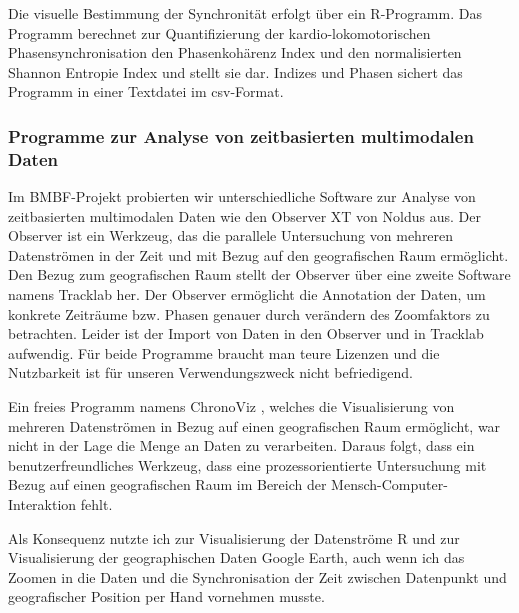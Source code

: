 Die visuelle Bestimmung der Synchronität erfolgt über ein R-Programm. Das Programm berechnet zur Quantifizierung der kardio-lokomotorischen Phasensynchronisation den Phasenkohärenz Index \citep{Rosenblum2003} und den normalisierten Shannon Entropie Index \citep{Tass1998, Niizeki2005} und stellt sie dar. Indizes und Phasen sichert das Programm in einer Textdatei im \acs{csv}-Format.

\subsubsection{Programme zur Analyse von zeitbasierten multimodalen Daten} 

\label{ssub:programme_zur_analyse_von_zeitbasierten_multimodalen_daten}

Im \acs{BMBF}-Projekt probierten wir unterschiedliche Software zur Analyse von zeitbasierten multimodalen Daten wie den Observer XT von Noldus aus. Der Observer ist ein Werkzeug, das die parallele Untersuchung von mehreren Datenströmen in der Zeit und mit Bezug auf den geografischen Raum ermöglicht. Den Bezug zum geografischen Raum stellt der Observer über eine zweite Software namens Tracklab her. Der Observer ermöglicht die Annotation der Daten, um konkrete Zeiträume bzw. Phasen genauer durch verändern des Zoomfaktors zu betrachten. Leider ist der Import von Daten in den Observer und in Tracklab aufwendig. Für beide Programme braucht man teure Lizenzen und die Nutzbarkeit ist für unseren Verwendungszweck nicht befriedigend.

Ein freies Programm namens ChronoViz \citep{Fouse2010, Fouse2011}, welches die Visualisierung von mehreren Datenströmen in Bezug auf einen geografischen Raum ermöglicht, war nicht in der Lage die Menge an Daten zu verarbeiten. Daraus folgt, dass ein benutzerfreundliches Werkzeug, dass eine prozessorientierte Untersuchung mit Bezug auf einen geografischen Raum im Bereich der Mensch-Computer-Interaktion fehlt.

Als Konsequenz nutzte ich zur Visualisierung der Datenströme R und zur Visualisierung der geographischen Daten Google Earth, auch wenn ich das Zoomen in die Daten und die Synchronisation der Zeit zwischen Datenpunkt und geografischer Position per Hand vornehmen musste.

